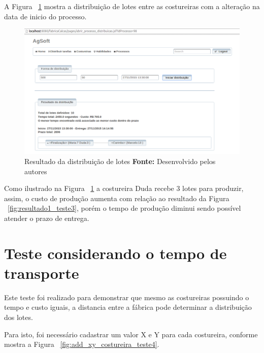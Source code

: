 A Figura ~\ref{fig:resultado2_teste3} mostra a distribuição de lotes entre as
costureiras com a alteração na data de inicio do processo.

\begin{figure}[h!]
	\centerline{\includegraphics[scale=0.4]{./imagens/resultado2_teste3.png}}
	\caption[Resultado da distribuição de lotes]
	{Resultado da distribuição de lotes \textbf{Fonte:} Desenvolvido pelos autores}
	\label{fig:resultado2_teste3}
\end{figure}

\par Como ilustrado na Figura ~\ref{fig:resultado2_teste3} a costureira Duda
recebe 3 lotes para produzir, assim, o custo de produção aumenta com relação ao 
resultado da Figura ~\ref{fig:resultado1_teste3}, porém o tempo de produção diminui
sendo possível atender o prazo de entrega.


\section{Teste considerando o tempo de transporte}

\par Este teste foi realizado para demonstrar que mesmo as costureiras possuindo
o tempo e custo iguais, a distancia entre a fábrica pode determinar a
distribuição dos lotes.

\par Para isto, foi necessário cadastrar um valor X e Y para cada costureira, 
conforme mostra a Figura ~\ref{fig:add_xy_costureira_teste4}.

\newpage


